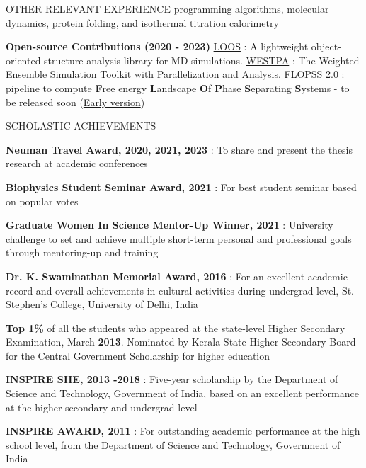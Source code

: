 \documentclass{resume} %
\begin{document}
\begin{rSection}{OTHER RELEVANT EXPERIENCE}
{      programming algorithms, molecular dynamics, protein folding, and isothermal titration calorimetry
   }
   \item \textbf{Open-source Contributions (2020 - 2023)} {\href{https://github.com/GrossfieldLab/loos}{LOOS} : A lightweight object-oriented structure analysis library for MD simulations.
      \href{https://github.com/westpa/westpa}{WESTPA} : The Weighted Ensemble Simulation Toolkit with Parallelization and Analysis}. FLOPSS 2.0 : pipeline to compute \textbf{F}ree energy \textbf{L}andscape \textbf{O}f \textbf{P}hase \textbf{S}eparating \textbf{S}ystems - to be released soon (\href{https://github.com/Poruthoor/Phase_Separation_Article/tree/main/FLOPSS}{Early version})
\end{rSection}

\begin{rSection}{SCHOLASTIC ACHIEVEMENTS}
   \vspace{-1.25em}
   \item \textbf{Neuman Travel Award, 2020, 2021, 2023} : To share and present the thesis research at academic conferences
   \item \textbf{Biophysics Student Seminar Award, 2021} : For best student seminar based on popular votes
   \item \textbf{Graduate Women In Science Mentor-Up Winner, 2021} : University challenge to set and achieve multiple short-term personal and professional goals through mentoring-up and training
   \item \textbf{Dr. K. Swaminathan Memorial Award, 2016} : For an excellent academic record and overall achievements in cultural activities during undergrad level, St. Stephen's College, University of Delhi, India
   \item \textbf{Top 1\%} of all the students who appeared at the state-level Higher Secondary Examination, March \textbf{2013}. Nominated by Kerala State Higher Secondary Board for the Central Government Scholarship for higher education
   \item \textbf{INSPIRE SHE, 2013 -2018} : Five-year scholarship by the Department of Science and Technology, Government of India, based on an excellent performance at the higher secondary and undergrad level
   \item \textbf{INSPIRE AWARD, 2011} : For outstanding academic performance at the high school level, from the Department of Science and Technology, Government of India \\

\end{rSection}
\end{document}

